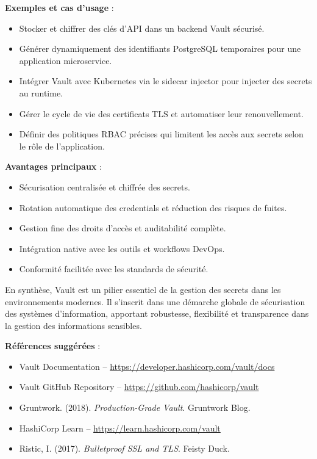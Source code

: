 \textbf{Exemples et cas d’usage} :
\begin{itemize}
	\item Stocker et chiffrer des clés d’API dans un backend Vault sécurisé.
	\item Générer dynamiquement des identifiants PostgreSQL temporaires pour une application microservice.
	\item Intégrer Vault avec Kubernetes via le sidecar injector pour injecter des secrets au runtime.
	\item Gérer le cycle de vie des certificats TLS et automatiser leur renouvellement.
	\item Définir des politiques RBAC précises qui limitent les accès aux secrets selon le rôle de l’application.
\end{itemize}

\textbf{Avantages principaux} :
\begin{itemize}
	\item Sécurisation centralisée et chiffrée des secrets.
	\item Rotation automatique des credentials et réduction des risques de fuites.
	\item Gestion fine des droits d’accès et auditabilité complète.
	\item Intégration native avec les outils et workflows DevOps.
	\item Conformité facilitée avec les standards de sécurité.
\end{itemize}

En synthèse, Vault est un pilier essentiel de la gestion des secrets dans les environnements modernes. Il s’inscrit dans une démarche globale de sécurisation des systèmes d’information, apportant robustesse, flexibilité et transparence dans la gestion des informations sensibles.

\textbf{Références suggérées} :
\begin{itemize}
	\item Vault Documentation – \url{https://developer.hashicorp.com/vault/docs}
	\item Vault GitHub Repository – \url{https://github.com/hashicorp/vault}
	\item Gruntwork. (2018). \textit{Production-Grade Vault}. Gruntwork Blog.
	\item HashiCorp Learn – \url{https://learn.hashicorp.com/vault}
	\item Ristic, I. (2017). \textit{Bulletproof SSL and TLS}. Feisty Duck.
\end{itemize}

